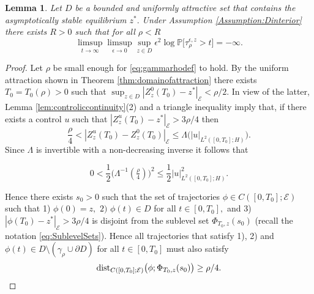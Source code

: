 \documentclass[10pt, reqno]{amsart}
\newcommand{\pr}{\mathbb{P}}
\newcommand{\e}{\mathcal{E}}
\newtheorem{lem}{Lemma}
\theoremstyle{definition}
\numberwithin{lem}{section}
\numberwithin{cor}{section}
\numberwithin{prop}{section}
\numberwithin{thm}{section}
\numberwithin{dfn}{section}
\begin{document}
\begin{lem}\label{lem:meandering} Let $D$ be a bounded and uniformly attractive set that contains the asymptotically stable equilibrium $z^*.$ Under Assumption \ref{Assumption:Dinterior} there exists $R>0$ such that for all $\rho<R$
\begin{equation*}    \limsup_{t\to\infty}\limsup_{\epsilon\to 0}\sup_{z\in D}\epsilon^2\log\pr\bigg[ \tau^{\epsilon, z}_{\rho}>t   \bigg]=-\infty.
\end{equation*} 
\end{lem}

\begin{proof} 
Let $\rho$ be small enough for \eqref{eq:gammarhodef} to hold. By the uniform attraction shown in Theorem \ref{thm:domainofattraction} there exists $T_0=T_0(\rho)>0$ such that $\sup_{z\in D}|Z_z^0(T_0)-z^*|_\e<\rho/2.$ In view of the latter, Lemma \ref{lem:controliccontinuity}(2)  and a triangle inequality imply that, if there exists a control $u$ such that $|Z^u_z(T_0)-z^*|_{\e}> 3\rho/4$ 
then 
$$  \frac{\rho}{4}< |Z^{u}_z(T_0)-Z^0_z(T_0)|_{\e}\leq \Lambda\big(|u|_{L^2([0,T_0];H)}\big).$$ Since $\Lambda$ is invertible with a non-decreasing inverse it follows that

$$  0<\frac{1}{2}\bigg(\Lambda^{-1}(\tfrac{\rho}{4})\bigg)^2\leq \frac{1}{2}|u|^2_{L^2([0,T_0];H)}.      $$

Hence there exists $s_0>0$ such that the set of trajectories $\phi\in C([0,T_0];\e)$ such that 1) $\phi(0)=z,$ $2)$ $\phi(t)\in D$ for all $t\in[0,T_0],$ and 3) $|\phi(T_0)-z^*|_{\e}> 3\rho/4$ is disjoint from the sublevel set $\Phi_{ T_0, z}(s_0)$ (recall the notation \eqref{eq:SublevelSets}). Hence all trajectories that satisfy 1), 2) and $\phi(t)\in D\setminus (\gamma_\rho\cup\partial D)$ for all $t\in [0,T_0]$ must also satisfy $$ \textnormal{dist}_{C([0,T_0];\e)}\big(\phi; \Phi_{T_0, z}(s_0)\big)\geq \rho/4. $$ 


\end{proof}
\end{document}
